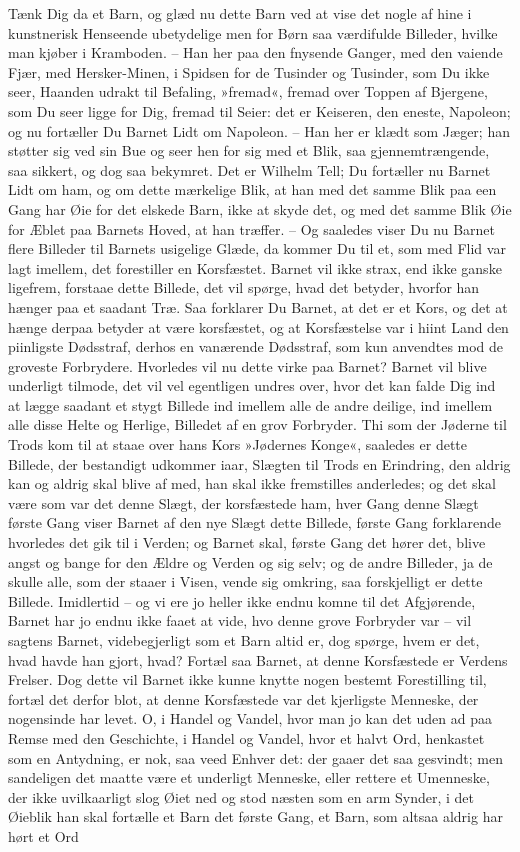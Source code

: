 \documentclass[12pt,a4paper]{article}
\begin{document}
Tænk Dig da et Barn, og glæd nu dette Barn ved at vise det nogle af hine i kunstnerisk Henseende ubetydelige men for Børn saa værdifulde Billeder, hvilke man kjøber i Kramboden. – Han her paa den fnysende Ganger, med den vaiende Fjær, med Hersker-Minen, i Spidsen for de Tusinder og Tusinder, som Du ikke seer, Haanden udrakt til Befaling, »fremad«, fremad over Toppen af Bjergene, som Du seer ligge for Dig, fremad til Seier: det er Keiseren, den eneste, Napoleon; og nu fortæller Du Barnet Lidt om Napoleon. – Han her er klædt som Jæger; han støtter sig ved sin Bue og seer hen for sig med et Blik, saa gjennemtrængende, saa sikkert, og dog saa bekymret. Det er Wilhelm Tell; Du fortæller nu Barnet Lidt om ham, og om dette mærkelige Blik, at han med det samme Blik paa een Gang har Øie for det elskede Barn, ikke at skyde det, og med det samme Blik Øie for Æblet paa Barnets Hoved, at han træffer. – Og saaledes viser Du nu Barnet flere Billeder til Barnets usigelige Glæde, da kommer Du til et, som med Flid var lagt imellem, det forestiller en Korsfæstet. Barnet vil ikke strax, end ikke ganske ligefrem, forstaae dette Billede, det vil spørge, hvad det betyder, hvorfor han hænger paa et saadant Træ. Saa forklarer Du Barnet, at det er et Kors, og det at hænge derpaa betyder at være korsfæstet, og at Korsfæstelse var i hiint Land den piinligste Dødsstraf, derhos en vanærende Dødsstraf, som kun anvendtes mod de groveste Forbrydere. Hvorledes vil nu dette virke paa Barnet? Barnet vil blive underligt tilmode, det vil vel egentligen undres over, hvor det kan falde Dig ind at lægge saadant et stygt Billede ind imellem alle de andre deilige, ind imellem alle disse Helte og Herlige, Billedet af en grov Forbryder. Thi som der Jøderne til Trods kom til at staae over hans Kors »Jødernes Konge«, saaledes er dette Billede, der bestandigt udkommer iaar, Slægten til Trods en Erindring, den aldrig kan og aldrig skal blive af med, han skal ikke fremstilles anderledes; og det skal være som var det denne Slægt, der korsfæstede ham, hver Gang denne Slægt første Gang viser Barnet af den nye Slægt dette Billede, første Gang forklarende hvorledes det gik til i Verden; og Barnet skal, første Gang det hører det, blive angst og bange for den Ældre og Verden og sig selv; og de andre Billeder, ja de skulle alle, som der staaer i Visen, vende sig omkring, saa forskjelligt er dette Billede. Imidlertid – og vi ere jo heller ikke endnu komne til det Afgjørende, Barnet har jo endnu ikke faaet at vide, hvo denne grove Forbryder var – vil sagtens Barnet, videbegjerligt som et Barn altid er, dog spørge, hvem er det, hvad havde han gjort, hvad? Fortæl saa Barnet, at denne Korsfæstede er Verdens Frelser. Dog dette vil Barnet ikke kunne knytte nogen bestemt Forestilling til, fortæl det derfor blot, at denne Korsfæstede var det kjerligste Menneske, der nogensinde har levet. O, i Handel og Vandel, hvor man jo kan det uden ad paa Remse med den Geschichte, i Handel og Vandel, hvor et halvt Ord, henkastet som en Antydning, er nok, saa veed Enhver det: der gaaer det saa gesvindt; men sandeligen det maatte være et underligt Menneske, eller rettere et Umenneske, der ikke uvilkaarligt slog Øiet ned og stod næsten som en arm Synder, i det Øieblik han skal fortælle et Barn det første Gang, et Barn, som altsaa aldrig har hørt et Ord 
\end{document}
